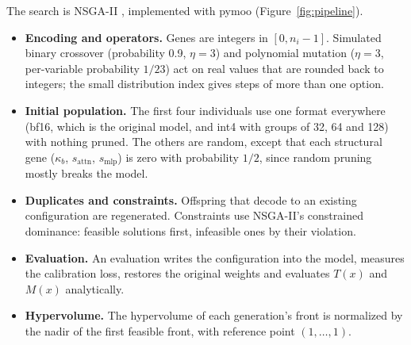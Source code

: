\documentclass[11pt]{article}
\begin{document}
The search is NSGA-II \cite{deb2002nsga2}, implemented with pymoo \cite{blank2020pymoo}
(Figure~\ref{fig:pipeline}).
\begin{itemize}
  \item \textbf{Encoding and operators.} Genes are integers in $[0,n_i-1]$. Simulated binary crossover
        (probability 0.9, $\eta=3$) and polynomial mutation ($\eta=3$, per-variable probability
        $1/23$) act on real values that are rounded back to integers; the small distribution index gives
        steps of more than one option.
  \item \textbf{Initial population.} The first four individuals use one format everywhere (bf16, which
        is the original model, and int4 with groups of 32, 64 and 128) with nothing pruned. The others
        are random, except that each structural gene ($\kappa_b$, $s_{\text{attn}}$, $s_{\text{mlp}}$)
        is zero with probability $1/2$, since random pruning mostly breaks the model.
  \item \textbf{Duplicates and constraints.} Offspring that decode to an existing configuration are
        regenerated. Constraints use NSGA-II's constrained dominance: feasible solutions first,
        infeasible ones by their violation.
  \item \textbf{Evaluation.} An evaluation writes the configuration into the model, measures the
        calibration loss, restores the original weights and evaluates $T(x)$ and $M(x)$ analytically.
  \item \textbf{Hypervolume.} The hypervolume \cite{zitzler1999hypervolume} of each generation's front
        is normalized by the nadir of the first feasible front, with reference point $(1,\dots,1)$.
\end{itemize}
\end{document}
